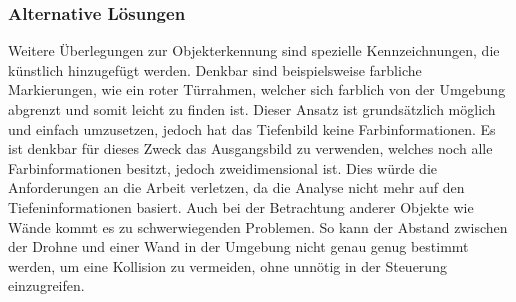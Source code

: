 \subsubsection{Alternative Lösungen}
Weitere Überlegungen zur Objekterkennung sind spezielle Kennzeichnungen, die künstlich hinzugefügt werden. Denkbar sind beispielsweise farbliche Markierungen, wie ein roter Türrahmen, welcher sich farblich von der Umgebung abgrenzt und somit leicht zu finden ist. Dieser Ansatz ist grundsätzlich möglich und einfach umzusetzen, jedoch hat das Tiefenbild keine Farbinformationen. \newline
Es ist denkbar für dieses Zweck das Ausgangsbild zu verwenden, welches noch alle Farbinformationen besitzt, jedoch zweidimensional ist. Dies würde die Anforderungen an die Arbeit verletzen, da die Analyse nicht mehr auf den Tiefeninformationen basiert. \newline
Auch bei der Betrachtung anderer Objekte wie Wände kommt es zu schwerwiegenden Problemen. So kann der Abstand zwischen der Drohne und einer Wand in der Umgebung nicht genau genug bestimmt werden, um eine Kollision zu vermeiden, ohne unnötig in der Steuerung einzugreifen.